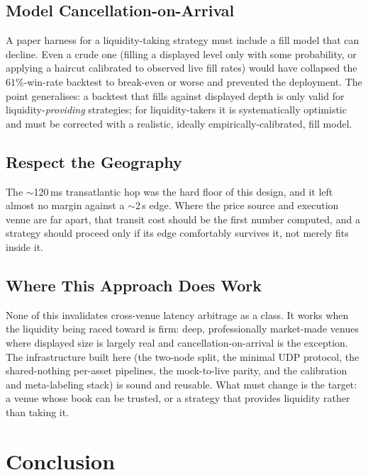 \documentclass{tmsce}
\let\oldsection\section
\renewcommand{\section}{\clearpage\oldsection}
\begin{document}
\subsection{Model Cancellation-on-Arrival}

A paper harness for a liquidity-taking strategy must include a fill model that can
decline. Even a crude one (filling a displayed level only with some probability, or
applying a haircut calibrated to observed live fill rates) would have collapsed the
$61\%$-win-rate backtest to break-even or worse and prevented the deployment. The point
generalises: a backtest that fills against displayed depth is only valid for
liquidity-\emph{providing} strategies; for liquidity-takers it is systematically
optimistic and must be corrected with a realistic, ideally empirically-calibrated,
fill model.

\subsection{Respect the Geography}

The $\sim$120\,ms transatlantic hop was the hard floor of this design, and it left
almost no margin against a $\sim$2\,s edge. Where the price source and execution
venue are far apart, that transit cost should be the first number computed, and a
strategy should proceed only if its edge comfortably survives it, not merely fits
inside it.

\subsection{Where This Approach Does Work}

None of this invalidates cross-venue latency arbitrage as a class. It works when the
liquidity being raced toward is firm: deep, professionally market-made venues where
displayed size is largely real and cancellation-on-arrival is the exception. The
infrastructure built here (the two-node split, the minimal UDP protocol, the
shared-nothing per-asset pipelines, the mock-to-live parity, and the calibration and
meta-labeling stack) is sound and reusable. What must change is the target: a venue
whose book can be trusted, or a strategy that provides liquidity rather than taking
it.


\section{Conclusion}
\end{document}
